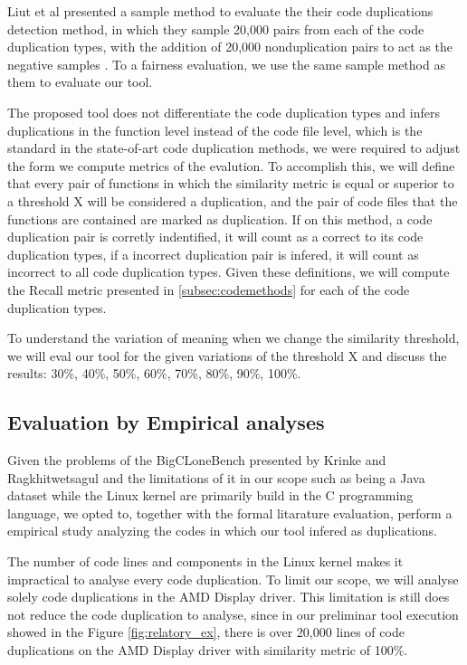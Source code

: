 Liut et al presented a sample method to evaluate the their code duplications detection method, in which they sample 20,000 pairs
from each of the code duplication types, with the addition of 20,000 nonduplication pairs to act as the negative samples
\citep{tailor}. To a fairness evaluation, we use the same sample method as them to evaluate our tool.

The proposed tool does not differentiate the code duplication types and infers duplications in the function level instead of the 
code file level, which is the standard in the state-of-art code duplication methods, we were required to adjust the form 
we compute metrics of the evalution. To accomplish this, we will define that every pair of functions in which the similarity metric
is equal or superior to a threshold X will be considered a duplication, and the pair of code files that the functions are contained
are marked as duplication. If on this method, a code duplication pair is corretly indentified, it will count as a correct to its 
code duplication types, if a incorrect duplication pair is infered, it will count as incorrect to all code duplication types. Given
these definitions, we will compute the Recall metric presented in \ref{subsec:codemethods} for each of the code duplication types.

To understand the variation of meaning when we change the similarity threshold, we will eval our tool for the given variations of
the threshold X and discuss the results: 30\%, 40\%, 50\%, 60\%, 70\%, 80\%, 90\%, 100\%.

\subsection{Evaluation by Empirical analyses}

Given the problems of the BigCLoneBench presented by Krinke and Ragkhitwetsagul \citep{bigfail} and the limitations of it in our
scope such as being a Java dataset while the Linux kernel are primarily build in the C programming language, we opted to, together
with the formal litarature evaluation, perform a empirical study analyzing the codes in which our tool infered as duplications. 

The number of code lines and components in the Linux kernel makes it impractical to analyse every code duplication. To limit our
scope, we will analyse solely code duplications in the AMD Display driver. This limitation is still does not reduce the code
duplication to analyse, since in our preliminar tool execution showed in the Figure \ref{fig:relatory_ex}, there is over 20,000
lines of code duplications on the AMD Display driver with similarity metric of 100\%.


